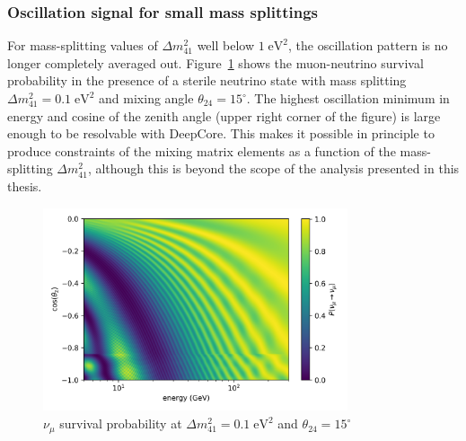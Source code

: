 \subsubsection{Oscillation signal for small mass splittings}
For mass-splitting values of $\Delta m^2_{41}$ well below $1\;\mathrm{eV^2}$, the oscillation pattern is no longer completely averaged out. Figure~\ref{fig:numu_survival_0.1eV2_analysis_binning_range} shows the muon-neutrino survival probability in the presence of a sterile neutrino state with mass splitting $\Delta m^2_{41}=0.1\;\mathrm{eV^2}$ and mixing angle $\theta_{24}=15^\circ$. The highest oscillation minimum in energy and cosine of the zenith angle (upper right corner of the figure) is large enough to be resolvable with DeepCore. This makes it possible in principle to produce constraints of the mixing matrix elements as a function of the mass-splitting $\Delta m^2_{41}$, although this is beyond the scope of the analysis presented in this thesis.
\begin{figure}
    \centering
    \includegraphics[width=0.8\textwidth]{figures/measurement/sterile_analysis/physics/dm41_0.1eV2_th24_15deg_avg_height_10-30km_ana_binning_range.png}
    \caption{$\nu_{\mu}$ survival probability at $\Delta m^2_{41}=0.1\;\mathrm{eV^2}$ and $\theta_{24}=15^\circ$}
    \label{fig:numu_survival_0.1eV2_analysis_binning_range}
\end{figure}

